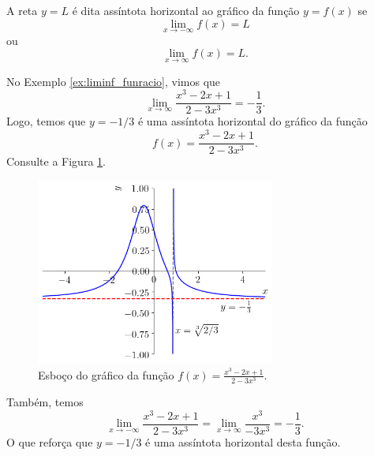 A reta $y = L$ é dita assíntota horizontal ao gráfico da função $y = f(x)$ se
\begin{equation}
  \lim_{x\to -\infty} f(x) = L
\end{equation}
ou
\begin{equation}
  \lim_{x\to\infty} f(x) = L.
\end{equation}

\begin{ex}\label{ex:ass_hor}
  No Exemplo \ref{ex:liminf_funracio}, vimos que
  \begin{equation}
    \lim_{x\to\infty} \frac{x^3 - 2x + 1}{2 - 3x^3} = -\frac{1}{3}.
  \end{equation}
  Logo, temos que $y=-1/3$ é uma assíntota horizontal do gráfico da função
  \begin{equation}
    f(x) = \frac{x^3 - 2x + 1}{2 - 3x^3}.
  \end{equation}
  Consulte a Figura \ref{fig:ex_ass_horizon}.

      \begin{figure}[H]
      \centering
      \includegraphics[width=0.7\textwidth]{./cap_lim/dados/fig_ex_ass_horizon/fig_ex_ass_horizon}
      \caption{Esboço do gráfico da função $\displaystyle f(x) = \frac{x^3 - 2x + 1}{2 - 3x^3}$.}
      \label{fig:ex_ass_horizon}
    \end{figure}

  Também, temos
  \begin{equation}
    \lim_{x\to -\infty} \frac{x^3 - 2x + 1}{2 - 3x^3} = \lim_{x\to\infty} \frac{x^3}{-3x^3} = -\frac{1}{3}.
  \end{equation}
  O que reforça que $y = -1/3$ é uma assíntota horizontal desta função.
\end{ex}

